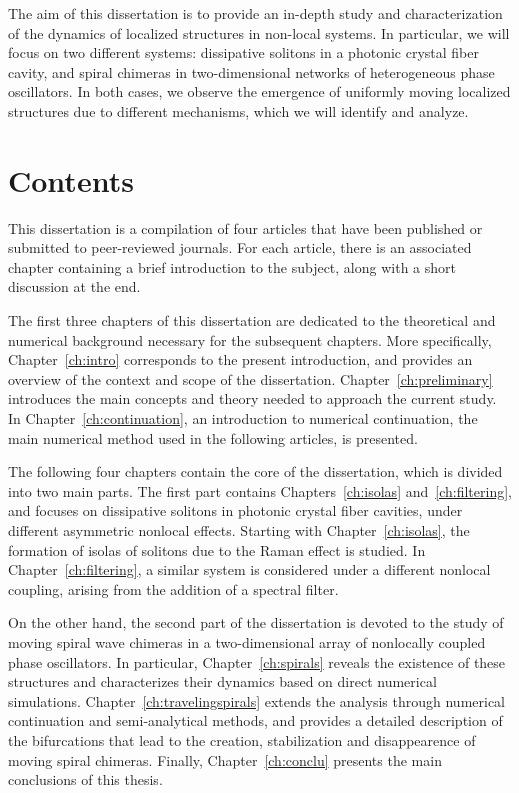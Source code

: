 The aim of this dissertation is to provide an in-depth study and characterization of
the dynamics of localized structures in non-local systems. In particular, we will focus 
on two different systems: dissipative solitons in a photonic
crystal fiber cavity, and spiral chimeras in two-dimensional networks of heterogeneous phase oscillators. 
In both cases, we observe the emergence of uniformly moving localized structures due to different mechanisms,
which we will identify and analyze.

\section{Contents}

This dissertation is a compilation of four articles that have been published or submitted to peer-reviewed journals.
For each article, there is an associated chapter containing a brief introduction to the subject, 
along with a short discussion at the end. 

The first three chapters of this dissertation are dedicated
to the theoretical and numerical background necessary for the subsequent chapters. More specifically,
Chapter~\ref{ch:intro} corresponds to the present introduction, and provides an overview of the context and 
scope of the dissertation. Chapter~\ref{ch:preliminary} introduces the main concepts and theory needed 
to approach the current study. In Chapter~\ref{ch:continuation}, an introduction to numerical continuation,
the main numerical method used in the following articles, is presented. 

The following four chapters contain the core of the dissertation, which is divided into two main parts. The first
part contains Chapters~\ref{ch:isolas} and~\ref{ch:filtering}, and focuses on dissipative solitons in photonic crystal 
fiber cavities, under different asymmetric nonlocal effects. Starting with Chapter~\ref{ch:isolas},
the formation of isolas of solitons due to the Raman effect is studied. In Chapter~\ref{ch:filtering}, a similar 
system is considered under a different nonlocal coupling, arising from the addition of a spectral filter.

On the other hand, the second part of the dissertation is devoted to the study of moving spiral wave chimeras
in a two-dimensional array of nonlocally coupled phase oscillators. In particular, Chapter~\ref{ch:spirals}
reveals the existence of these structures and characterizes their dynamics based on direct numerical simulations.
Chapter~\ref{ch:travelingspirals} extends the analysis through numerical continuation and semi-analytical methods,
and provides a detailed description of the bifurcations that lead to the creation, stabilization and disappearence of
moving spiral chimeras. Finally, Chapter~\ref{ch:conclu} presents the main conclusions of this thesis.


